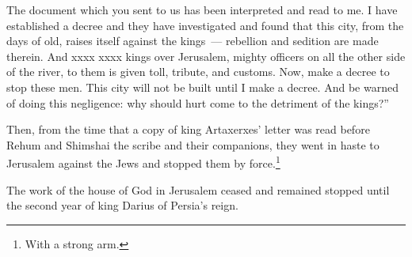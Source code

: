 \begin{inparaenum}
     The document which you sent to us has been interpreted and read to me.%
     I have established a decree and they have investigated and found that this city, from the days of old, raises itself against the kings~--- rebellion and sedition are made therein.%
     And xxxx xxxx kings over Jerusalem, mighty officers on all the other side of the river, to them is given toll, tribute, and customs.%
     Now, make a decree to stop these men. This city will not be built until I make a decree.%
     And be warned of doing this negligence: why should hurt come to the detriment of the kings?''%
    
     Then, from the time that a copy of king Artaxerxes' letter was read before Rehum and Shimshai the scribe and their companions, they went in haste to Jerusalem against the Jews and stopped them by force.\footnote{With a strong arm.}%
    
     The work of the house of God in Jerusalem ceased and remained stopped until the second year of king Darius of Persia's reign.%
\end{inparaenum}
